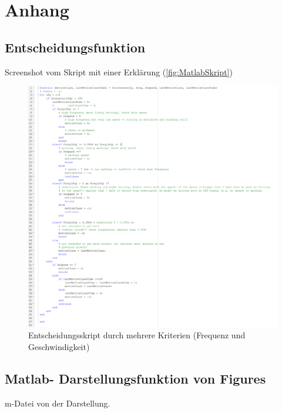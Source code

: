 \chapter{Anhang} \label{chap:Anhang}
\section{Entscheidungsfunktion} \label{Anh:Entscheidungsfunktion}
Screenshot vom Skript mit einer Erklärung (\autoref{fig:MatlabSkript})
\begin{figure}[H]
	\centering
	\includegraphics[width=\linewidth]{Bilder/MatlabSkript.png}
	\caption{Entscheidungsskript durch mehrere Kriterien (Frequenz und Geschwindigkeit)}
	\label{fig:MatlabSkript}
\end{figure}

\section{Matlab- Darstellungsfunktion von Figures}

m-Datei von der Darstellung.
